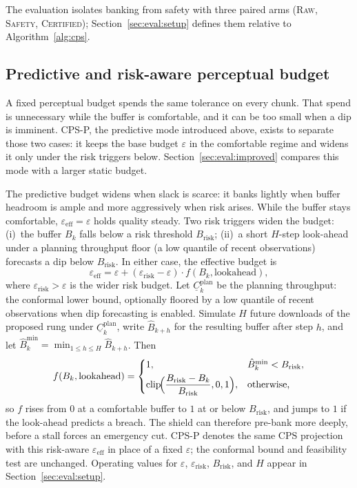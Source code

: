The evaluation isolates banking from safety with three paired arms (\textsc{Raw}, \textsc{Safety}, \textsc{Certified}); Section~\ref{sec:eval:setup} defines them relative to Algorithm~\ref{alg:cps}.

\subsection{Predictive and risk-aware perceptual budget}
\label{sec:method:predictive}

A fixed perceptual budget spends the same tolerance on every chunk.
That spend is unnecessary while the buffer is comfortable, and it can be too small when a dip is imminent.
CPS-P, the predictive mode introduced above, exists to separate those two cases: it keeps the base budget \(\varepsilon\) in the comfortable regime and widens it only under the risk triggers below.
Section~\ref{sec:eval:improved} compares this mode with a larger static budget.

The predictive budget widens when slack is scarce: it banks lightly when buffer headroom is ample and more aggressively when risk arises.
While the buffer stays comfortable, \(\varepsilon_{\mathrm{eff}}{=}\varepsilon\) holds quality steady.
Two risk triggers widen the budget: (i)~the buffer \(B_k\) falls below a risk threshold \(B_{\mathrm{risk}}\); (ii)~a short \(H\)-step look-ahead under a planning throughput floor (a low quantile of recent observations) forecasts a dip below \(B_{\mathrm{risk}}\).
In either case, the effective budget is
\begin{equation}
\label{eq:eps-eff}
    \varepsilon_{\mathrm{eff}}=\varepsilon+(\varepsilon_{\mathrm{risk}}-\varepsilon)\cdot f(B_k,\mathrm{lookahead}),
\end{equation}
where \(\varepsilon_{\mathrm{risk}}>\varepsilon\) is the wider risk budget.
Let \(\underline{C}_k^{\mathrm{plan}}\) be the planning throughput: the conformal lower bound, optionally floored by a low quantile of recent observations when dip forecasting is enabled.
Simulate \(H\) future downloads of the proposed rung under \(\underline{C}_k^{\mathrm{plan}}\), write \(\hat{B}_{k+h}\) for the resulting buffer after step \(h\), and let \(\hat{B}^{\min}_k=\min_{1\le h\le H}\hat{B}_{k+h}\).
Then
\begin{equation}
\label{eq:f-ramp}
    f(B_k,\mathrm{lookahead})
    =
    \begin{cases}
      1, & \hat{B}^{\min}_k<B_{\mathrm{risk}},\\[0.3em]
      \mathrm{clip}\!\Bigl(\dfrac{B_{\mathrm{risk}}-B_k}{B_{\mathrm{risk}}},0,1\Bigr), & \text{otherwise,}
    \end{cases}
\end{equation}
so \(f\) rises from \(0\) at a comfortable buffer to \(1\) at or below \(B_{\mathrm{risk}}\), and jumps to \(1\) if the look-ahead predicts a breach.
The shield can therefore pre-bank more deeply, before a stall forces an emergency cut.
CPS-P denotes the same CPS projection with this risk-aware \(\varepsilon_{\mathrm{eff}}\) in place of a fixed \(\varepsilon\); the conformal bound and feasibility test are unchanged.
Operating values for \(\varepsilon\), \(\varepsilon_{\mathrm{risk}}\), \(B_{\mathrm{risk}}\), and \(H\) appear in Section~\ref{sec:eval:setup}.

